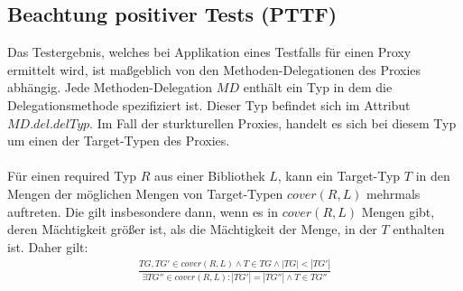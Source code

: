 \subsection{Beachtung positiver Tests (PTTF)}\label{sec_pttf}
Das Testergebnis, welches bei Applikation eines Testfalls für einen Proxy ermittelt wird, ist maßgeblich von den Methoden-Delegationen des Proxies abhängig. Jede Methoden-Delegation $\mathit{MD}$ enthält ein Typ in dem die Delegationsmethode spezifiziert ist. Dieser Typ befindet sich im Attribut $\mathit{MD.del.delTyp}$. Im Fall der sturkturellen Proxies, handelt es sich bei diesem Typ um einen der Target-Typen des Proxies.\\\\
Für einen required Typ $R$ aus einer Bibliothek $L$, kann ein Target-Typ $T$ in den Mengen der möglichen Mengen von Target-Typen $\mathit{cover(R,L)}$ mehrmals auftreten. Die gilt insbesondere dann, wenn es in $\mathit{cover(R,L)}$ Mengen gibt, deren Mächtigkeit größer ist, als die Mächtigkeit der Menge, in der $T$ enthalten ist. Daher gilt:
\begin{gather*}
\frac{\mathit{TG},\mathit{TG'} \in \mathit{cover(R,L)} \wedge T \in \mathit{TG} \wedge |\mathit{TG}| < |\mathit{TG'}|}{\exists \mathit{TG''} \in \mathit{cover(R,L)} : |\mathit{TG'}| = |\mathit{TG''}| \wedge T \in \mathit{TG''}}
\end{gather*}
\noindent
